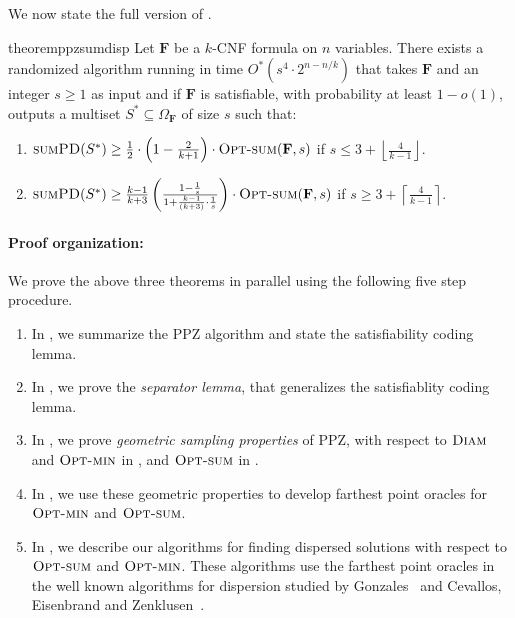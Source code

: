 \documentclass[11pt, letterpaper]{article}
\theoremstyle{definition}
\newcommand{\f}{\mathbf{F}}
\newcommand{\Om}{\Omega_{\f}}
\newcommand{\SPD}{\textsc{sumPD}}
\newcommand{\opts}{\textsc{Opt-sum}}
\newcommand{\optm}{\textsc{Opt-min}}
\newcommand{\D}{\textsc{Diam}}
\newcommand{\ceil}[1]{{\left\lceil{#1}\right\rceil}}
\newcommand{\floor}[1]{{\left\lfloor{#1}\right\rfloor}}
\begin{document}
We now state the full version of .
\begin{restatable}[PPZ approximating $\opts(\f,s)$]{theorem}{ppzsumdisp} \label{thm:ppz-for-sumdisp}
    Let $\f$ be a $k$-CNF formula on $n$ variables. There exists a randomized algorithm running in time $O^*\left(s^4 \cdot 2^{n-n/k}\right)$ that takes $\f$ and an integer $s \geq 1$ as input and if $\f$ is satisfiable, with probability at least $1-o(1)$, outputs a multiset $S^* \subseteq \Om$ of size $s$ such that:
    \begin{enumerate}
        \item $\SPD(S^*) \geq \frac{1}{2}\cdot \left(1-\frac{2}{k+1}\right) \cdot \opts(\f,s)$ if $s \leq 3 + \floor{\frac{4}{k-1}}$.
        \item $\SPD(S^*) \geq \frac{k-1}{k+3}\left(\frac{1-\frac{1}{s}}{1+\frac{k-1}{(k+3)}\cdot \frac{1}{s} }\right) \cdot \opts(\f,s)$ if $s \geq 3 + \ceil{\frac{4}{k-1}}$. 
    \end{enumerate}
\end{restatable}


\ppzmindisp*

\paragraph{Proof organization: } We prove the above three theorems in parallel using the following five step procedure. 
\begin{enumerate}
    \item In , we summarize the PPZ algorithm and state the satisfiability coding lemma.
    \item In , we prove the \emph{separator lemma}, that generalizes the satisfiablity coding lemma. 
    \item In , we prove \emph{geometric sampling properties} of PPZ, with respect to $\D$ and $\optm$ in , and $\opts$ in . 
    \item In , we use these geometric properties to develop farthest point oracles for $\optm$ and $\opts$. 
    \item In , we describe our algorithms for finding dispersed solutions with respect to $\opts$ and $\optm$. These algorithms use the farthest point oracles in the well known algorithms for dispersion studied by Gonzales~\cite{gonzalez1985clustering} and Cevallos, Eisenbrand and Zenklusen~\cite{cevallos2019improved}.  
\end{enumerate}
\end{document}
